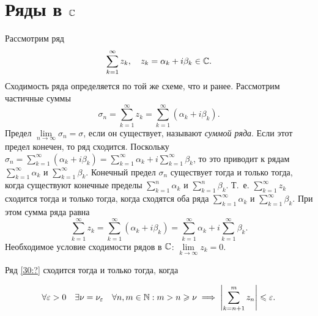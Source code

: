 \documentclass[../../main.tex]{subfiles}
\begin{document}
\section{Ряды в $\mathbb{C}$}
Рассмотрим ряд
\begin{equation}
\label{30:?}
\sum\limits_{k = 1}^{\infty} z_k , \quad z_k =
\alpha_k + i\beta_k \in \mathbb{C}. 
\end{equation}
Сходимость ряда определяется по той же схеме, что и ранее. Рассмотрим частичные суммы
\[ \sigma_n = \sum\limits_{k = 1}^{\infty} z_k =
\sum\limits_{k = 1}^{\infty} (\alpha_k + i\beta_k).\]
Предел $\lim\limits_{n \to \infty} \sigma_n = \sigma$,
если он существует, называют \emph{суммой ряда}. Если этот предел конечен, то ряд сходится.
Поскольку $\sigma_n = \sum\limits_{k = 1}^{\infty} (\alpha_k + i\beta_k) =
\sum\limits_{k = 1}^{\infty} \alpha_k +
i \sum\limits_{k = 1}^{\infty} \beta_k$,
то это приводит к рядам $\sum\limits_{k = 1}^{\infty} \alpha_k$ и
$\sum\limits_{k = 1}^{\infty} \beta_k$.
Конечный предел $\sigma_n$ существует тогда и только тогда, когда
существуют конечные пределы $\sum\limits_{k = 1}^{n} \alpha_k$ и
$\sum\limits_{k = 1}^{n} \beta_k$.
Т.~е. $\sum\limits_{k = 1}^{\infty} z_k$ сходится тогда и только тогда, когда
сходятся оба ряда $\sum\limits_{k = 1}^{\infty} \alpha_k$ и $
\sum\limits_{k = 1}^{\infty} \beta_k$. При этом сумма ряда равна
\[\sum\limits_{k = 1}^{\infty} z_k = \sum\limits_{k = 1}^{\infty}
(\alpha_k + i\beta_k) = \sum\limits_{k = 1}^{\infty} \alpha_k +
i\sum\limits_{k = 1}^{\infty} \beta_k.\]
Необходимое условие сходимости рядов в $\mathbb{C}$: $\lim\limits_{k \to \infty} z_k = 0$.

\begin{thm} Ряд \eqref{30:?} сходится тогда и только тогда, когда

\[ \forall \varepsilon > 0 \quad \exists \nu = \nu_\varepsilon \quad \forall n, m \in \mathbb{N} : 
m > n \geqslant \nu \implies
\left|{\sum_{k=n+1}^m z_n}\right| \leqslant \varepsilon. \]
\end{thm}
\end{document}
